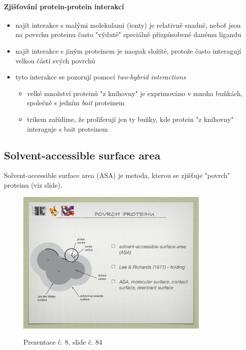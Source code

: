 \documentclass[DIV=8]{scrreprt}
\begin{document}
\paragraph{Zjišťování protein-protein interakcí}
\begin{itemize}[nosep]
    \item najít interakce s malými molekulami (ionty) je relativně snadné, neboť jsou na povrchu proteinu často "výdutě" speciálně přizpůsobené danému ligandu
    \item najít interakce s jiným proteinem je naopak složité, protože často interagují velkou částí svých povrchů
    \item tyto interakce se pozorují pomocí \emph{two-hybrid interactions}
\begin{itemize}[nosep]
    \item velké množství proteinů "z knihovny" je exprimováno v mnoha buňkách, společně s jedním \emph{bait} proteinem
    \item trikem zařídíme, že proliferují jen ty buňky, kde protein "z knihovny" interaguje s bait proteinem
\end{itemize}

\end{itemize}



\subsection{Solvent-accessible surface area} \label{Solvent-accessible surface area}


Solvent-accessible surface area (ASA) je metoda, kterou se zjišťuje "povrch" proteinu (viz slide). \begin{figure}
    \caption{Prezentace č. 8, slide č. 84}
    \includegraphics[width=0.85\textwidth]{slides-8/slide-84.jpg}
    \centering
    \label{slides-8-slide-84}
\end{figure}
\end{document}
